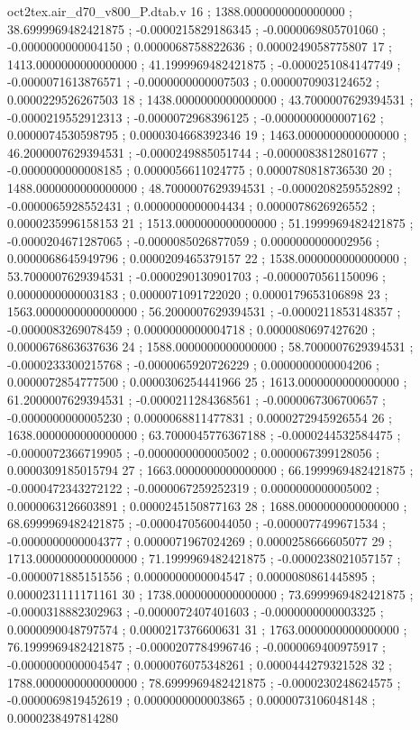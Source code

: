 \begin{filecontents}[overwrite]{oct2tex.air_d70_v800_P.dtab.v}
16 ; 1388.0000000000000000 ; 38.6999969482421875 ; -0.0000215829186345 ; -0.0000069805701060 ; -0.0000000000004150 ; 0.0000068758822636 ; 0.0000249058775807
17 ; 1413.0000000000000000 ; 41.1999969482421875 ; -0.0000251084147749 ; -0.0000071613876571 ; -0.0000000000007503 ; 0.0000070903124652 ; 0.0000229526267503
18 ; 1438.0000000000000000 ; 43.7000007629394531 ; -0.0000219552912313 ; -0.0000072968396125 ; -0.0000000000007162 ; 0.0000074530598795 ; 0.0000304668392346
19 ; 1463.0000000000000000 ; 46.2000007629394531 ; -0.0000249885051744 ; -0.0000083812801677 ; -0.0000000000008185 ; 0.0000056611024775 ; 0.0000780818736530
20 ; 1488.0000000000000000 ; 48.7000007629394531 ; -0.0000208259552892 ; -0.0000065928552431 ; 0.0000000000004434 ; 0.0000078626926552 ; 0.0000235996158153
21 ; 1513.0000000000000000 ; 51.1999969482421875 ; -0.0000204671287065 ; -0.0000085026877059 ; 0.0000000000002956 ; 0.0000068645949796 ; 0.0000209465379157
22 ; 1538.0000000000000000 ; 53.7000007629394531 ; -0.0000290130901703 ; -0.0000070561150096 ; 0.0000000000003183 ; 0.0000071091722020 ; 0.0000179653106898
23 ; 1563.0000000000000000 ; 56.2000007629394531 ; -0.0000211853148357 ; -0.0000083269078459 ; 0.0000000000004718 ; 0.0000080697427620 ; 0.0000676863637636
24 ; 1588.0000000000000000 ; 58.7000007629394531 ; -0.0000233300215768 ; -0.0000065920726229 ; 0.0000000000004206 ; 0.0000072854777500 ; 0.0000306254441966
25 ; 1613.0000000000000000 ; 61.2000007629394531 ; -0.0000211284368561 ; -0.0000067306700657 ; -0.0000000000005230 ; 0.0000068811477831 ; 0.0000272945926554
26 ; 1638.0000000000000000 ; 63.7000045776367188 ; -0.0000244532584475 ; -0.0000072366719905 ; -0.0000000000005002 ; 0.0000067399128056 ; 0.0000309185015794
27 ; 1663.0000000000000000 ; 66.1999969482421875 ; -0.0000472343272122 ; -0.0000067259252319 ; 0.0000000000005002 ; 0.0000063126603891 ; 0.0000245150877163
28 ; 1688.0000000000000000 ; 68.6999969482421875 ; -0.0000470560044050 ; -0.0000077499671534 ; -0.0000000000004377 ; 0.0000071967024269 ; 0.0000258666605077
29 ; 1713.0000000000000000 ; 71.1999969482421875 ; -0.0000238021057157 ; -0.0000071885151556 ; 0.0000000000004547 ; 0.0000080861445895 ; 0.0000231111171161
30 ; 1738.0000000000000000 ; 73.6999969482421875 ; -0.0000318882302963 ; -0.0000072407401603 ; -0.0000000000003325 ; 0.0000090048797574 ; 0.0000217376600631
31 ; 1763.0000000000000000 ; 76.1999969482421875 ; -0.0000207784996746 ; -0.0000069400975917 ; -0.0000000000004547 ; 0.0000076075348261 ; 0.0000444279321528
32 ; 1788.0000000000000000 ; 78.6999969482421875 ; -0.0000230248624575 ; -0.0000069819452619 ; 0.0000000000003865 ; 0.0000073106048148 ; 0.0000238497814280

\end{filecontents}
